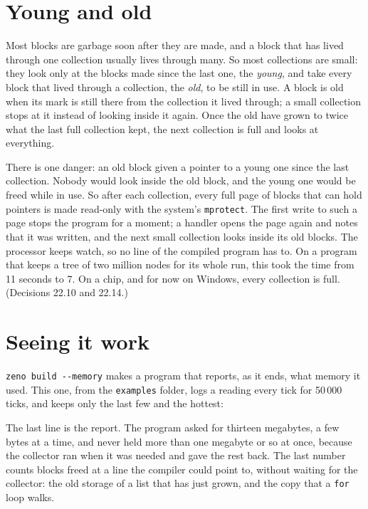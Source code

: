 \section{Young and old}

Most blocks are garbage soon after they are made, and a block that has
lived through one collection usually lives through many. So most
collections are small: they look only at the blocks made since the
last one, the \emph{young}, and take every block that lived through a
collection, the \emph{old}, to be still in use. A block is old when its
mark is still there from the collection it lived through; a small
collection stops at it instead of looking inside it again. Once the
old have grown to twice what the last full collection kept, the next
collection is full and looks at everything.

There is one danger: an old block given a pointer to a young one since
the last collection. Nobody would look inside the old block, and the
young one would be freed while in use. So after each collection, every
full page of blocks that can hold pointers is made read-only with the
system's \verb|mprotect|. The first write to such a page stops the
program for a moment; a handler opens the page again and notes that it
was written, and the next small collection looks inside its old blocks.
The processor keeps watch, so no line of the compiled program has to.
On a program that keeps a tree of two million nodes for its whole run,
this took the time from 11 seconds to 7. On a chip, and for now on
Windows, every collection is full. (Decisions 22.10 and 22.14.)

\section{Seeing it work}

\verb|zeno build --memory| makes a program that reports, as it ends,
what memory it used. This one, from the \verb|examples| folder, logs a
reading every tick for 50\,000 ticks, and keeps only the last few and
the hottest:

\begin{zeno}[src=examples/memory.zeno, cmd=zeno build --memory memory.zeno > /dev/null ;; ./memory, file=memory.zeno]
\end{zeno}

The last line is the report. The program asked for thirteen megabytes, a
few bytes at a time, and never held more than one megabyte or so at
once, because the collector ran when it was needed and gave the rest
back. The last number counts blocks freed at a line the compiler could
point to, without waiting for the collector: the old storage of a list
that has just grown, and the copy that a \verb|for| loop walks.

